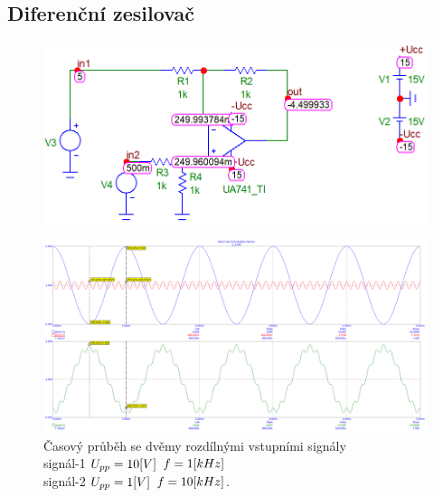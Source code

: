 \documentclass{article}
\begin{document}
\subsection*{Diferenční zesilovač}
\begin{figure}[H]
  \begin{minipage}[t]{\textwidth}
    \includegraphics[width=\textwidth]{PC/ukol3/DC.png}
  \end{minipage}
\end{figure}

\begin{figure}[H]
  \begin{minipage}[t]{\textwidth}
    \centering
    \includegraphics[width=\textwidth]{PC/ukol3/transient4.png}
    Časový průběh se dvěmy rozdílnými vstupními signály \\
    signál-1 \(U_{pp} = 10\-[V]\) \(f = 1\-[kHz]\) \\
    signál-2 \(U_{pp} = 1\-[V]\) \(f = 10\-[kHz]\).
  \end{minipage}
\end{figure}
\end{document}
